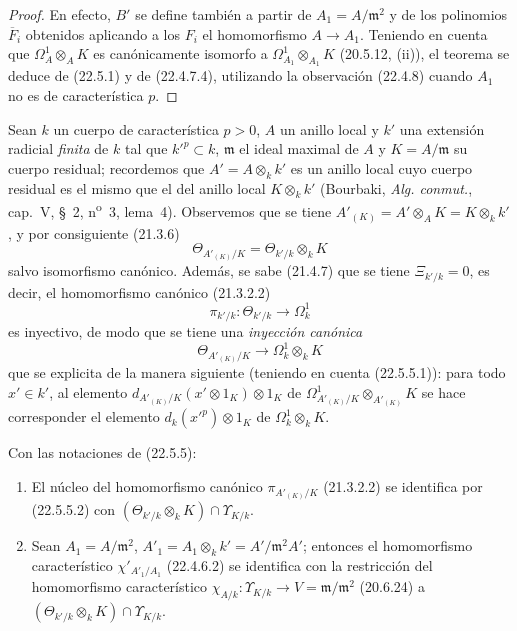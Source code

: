 \begin{proof}
En efecto, $B'$ se define también a partir de $A_1=A/\mathfrak m^2$ y de los
polinomios $\overline F_i$ obtenidos aplicando a los $F_i$ el homomorfismo
$A\longrightarrow A_1$. Teniendo en cuenta que $\Omega^1_A\otimes_AK$ es
canónicamente isomorfo a $\Omega^1_{A_1}\otimes_{A_1}K$ (20.5.12, (ii)), el
teorema se deduce de (22.5.1) y de (22.4.7.4), utilizando la observación
(22.4.8) cuando $A_1$ no es de característica $p$.
\end{proof}


\begin{env}[22.5.5]
\label{0.22.5.5-fr}
Sean $k$ un cuerpo de característica $p>0$, $A$ un anillo local y $k'$ una
extensión radicial \emph{finita} de $k$ tal que $k'^p\subset k$,
$\mathfrak m$ el ideal maximal de $A$ y $K=A/\mathfrak m$ su cuerpo residual;
recordemos que $A'=A\otimes_kk'$ es un anillo local cuyo cuerpo residual es
el mismo que el del anillo local $K\otimes_kk'$ (Bourbaki,
\emph{Alg. conmut.}, cap.~V, §~2, n\textsuperscript{o}~3, lema~4). Observemos que
se tiene $A'_{(K)}=A'\otimes_AK=K\otimes_kk'$, y por consiguiente (21.3.6)
\begin{equation}
\label{0.22.5.5.1-fr}
  \Theta_{A'_{(K)}/K}=\Theta_{k'/k}\otimes_kK
  \tag{22.5.5.1}
\end{equation}
salvo isomorfismo canónico. Además, se sabe (21.4.7) que se tiene
$\Xi_{k'/k}=0$, es decir, el homomorfismo canónico (21.3.2.2)
\[
  \pi_{k'/k}:\Theta_{k'/k}\longrightarrow\Omega^1_k
\]
es inyectivo, de modo que se tiene una \emph{inyección canónica}
\begin{equation}
\label{0.22.5.5.2-fr}
  \Theta_{A'_{(K)}/K}\longrightarrow\Omega^1_k\otimes_kK
  \tag{22.5.5.2}
\end{equation}
que se explicita de la manera siguiente (teniendo en cuenta (22.5.5.1)): para todo
$x'\in k'$, al elemento
$d_{A'_{(K)}/K}(x'\otimes1_K)\otimes1_K$ de
$\Omega^1_{A'_{(K)}/K}\otimes_{A'_{(K)}}K$ se hace corresponder el elemento
$d_k(x'^p)\otimes1_K$ de $\Omega^1_k\otimes_kK$.
\end{env}

\begin{lemma}[22.5.6]
\label{0.22.5.6-fr}
Con las notaciones de \textup{(22.5.5)}:
\begin{enumerate}
  \item[\rm(i)] El núcleo del homomorfismo canónico
  $\pi_{A'_{(K)}/K}$ \textup{(21.3.2.2)} se identifica por \textup{(22.5.5.2)} con
  $(\Theta_{k'/k}\otimes_kK)\cap\Upsilon_{K/k}$.
  \item[\rm(ii)] Sean $A_1=A/\mathfrak m^2$,
  $A'_1=A_1\otimes_kk'=A'/\mathfrak m^2A'$; entonces el homomorfismo
  característico $\chi'_{A'_1/A_1}$ \textup{(22.4.6.2)} se identifica con la restricción del
  homomorfismo característico
  $\chi_{A/k}:\Upsilon_{K/k}\longrightarrow V=\mathfrak m/\mathfrak m^2$
  \textup{(20.6.24)} a $(\Theta_{k'/k}\otimes_kK)\cap\Upsilon_{K/k}$.
\end{enumerate}
\end{lemma}

